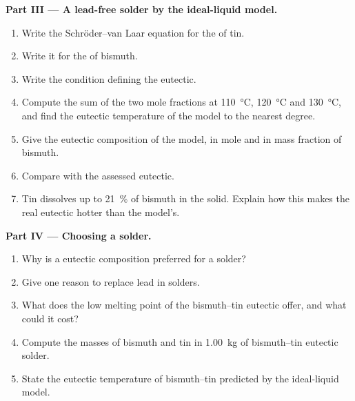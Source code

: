 \begin{problem}
\medskip
\noindent\textbf{Part III --- A lead-free solder by the ideal-liquid model.}
\begin{enumerate}[resume]
  \item Write the Schröder--van Laar equation for the  of tin.
  \item Write it for the  of bismuth.
  \item Write the condition defining the eutectic.
  \item Compute the sum of the two mole fractions at \qty{110}{\degreeCelsius},
        \qty{120}{\degreeCelsius} and \qty{130}{\degreeCelsius}, and find the
        eutectic temperature of the model to the nearest degree.
  \item Give the eutectic composition of the model, in mole and in mass
        fraction of bismuth.
  \item Compare with the assessed eutectic.
  \item Tin dissolves up to 21~\% of bismuth in the solid. Explain how this
        makes the real eutectic hotter than the model's.
\end{enumerate}

\medskip
\noindent\textbf{Part IV --- Choosing a solder.}
\begin{enumerate}[resume]
  \item Why is a eutectic composition preferred for a solder?
  \item Give one reason to replace lead in solders.
  \item What does the low melting point of the bismuth--tin eutectic offer, and
        what could it cost?
  \item Compute the masses of bismuth and tin in \qty{1.00}{kg} of
        bismuth--tin eutectic solder.
  \item State the eutectic temperature of bismuth--tin predicted by the
        ideal-liquid model.
\end{enumerate}
\end{problem}
